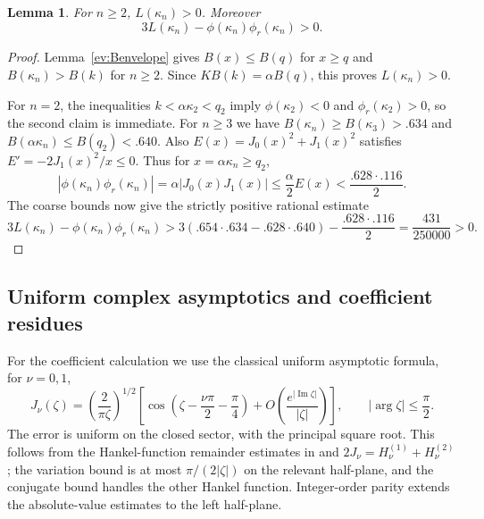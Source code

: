 \documentclass[11pt]{article}
\newtheorem{lemma}[theorem]{Lemma}
\theoremstyle{remark}
\begin{document}
\begin{lemma}\label{gm:residuepositive}
For $n\ge2$, $L(\kappa_n)>0$. Moreover
\[
 3L(\kappa_n)-\phi(\kappa_n)\phi_r(\kappa_n)>0.
\]
\end{lemma}
\begin{proof}
Lemma~\ref{ev:Benvelope} gives $B(x)\le B(q)$ for $x\ge q$ and
$B(\kappa_n)>B(k)$ for $n\ge2$. Since $KB(k)=\alpha B(q)$,
this proves $L(\kappa_n)>0$.

For $n=2$, the inequalities $k<\alpha\kappa_2<q_2$ imply
$\phi(\kappa_2)<0$ and $\phi_r(\kappa_2)>0$, so the second
claim is immediate. For $n\ge3$ we have
$B(\kappa_n)\ge B(\kappa_3)>.634$ and
$B(\alpha\kappa_n)\le B(q_2)<.640$. Also
$E(x)=J_0(x)^2+J_1(x)^2$ satisfies $E'=-2J_1(x)^2/x\le0$.
Thus for $x=\alpha\kappa_n\ge q_2$,
\[
 |\phi(\kappa_n)\phi_r(\kappa_n)|
 =\alpha|J_0(x)J_1(x)|\le\frac\alpha2 E(x)
 <\frac{.628\cdot.116}{2}.
\]
The coarse bounds now give the strictly positive rational estimate
\[
 3L(\kappa_n)-\phi(\kappa_n)\phi_r(\kappa_n)
 >3(.654\cdot.634-.628\cdot.640)-\frac{.628\cdot.116}2
 =\frac{431}{250000}>0.
\]
\end{proof}

\subsection{Uniform complex asymptotics and coefficient residues}
For the coefficient calculation we use the classical uniform asymptotic
formula, for $\nu=0,1$,
\begin{equation}\label{asym:uniformJ}
 J_\nu(\zeta)=\left(\frac2{\pi\zeta}\right)^{1/2}
 \left[\cos\left(\zeta-\frac{\nu\pi}2-\frac\pi4\right)
       +O\left(\frac{e^{|\operatorname{Im}\zeta|}}{|\zeta|}\right)\right],
 \qquad |\arg\zeta|\le\frac\pi2.
\end{equation}
The error is uniform on the closed sector, with the principal square
root. This follows from the Hankel-function remainder estimates in
\cite[\S10.17(iv), Eqs.~10.17.13--10.17.15]{DLMF} and
$2J_\nu=H_\nu^{(1)}+H_\nu^{(2)}$; the variation bound is at most
$\pi/(2|\zeta|)$ on the relevant half-plane, and the conjugate bound
handles the other Hankel function. Integer-order parity extends the
absolute-value estimates to the left half-plane.
\end{document}
